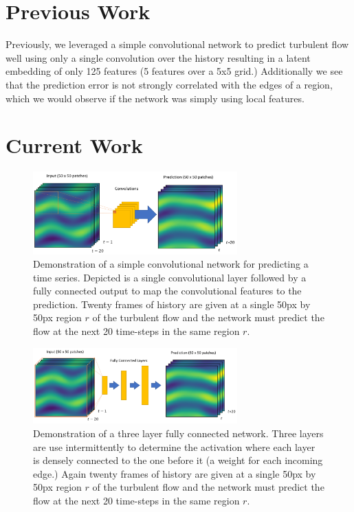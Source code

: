 \documentclass[10pt,letterpaper]{article}
\author{Brandon Houghton}
\begin{document}
	


\section{Previous Work}
Previously, we leveraged a simple convolutional network to predict turbulent flow  well using only a single convolution over the history resulting in a latent embedding of only 125 features (5 features over a 5x5 grid.) Additionally we see that the prediction error is not strongly correlated with the edges of a region, which we would observe if the network was simply using local features. 

\section{Current Work}


\begin{figure}
	\begin{center}
		\includegraphics[width=0.7\textwidth]{images/network_conv.PNG}
		\caption{\small Demonstration of a simple convolutional network for predicting a time series. Depicted is a single convolutional layer followed by a fully connected output to map the convolutional features to the prediction. Twenty frames of history are given at a single 50px by 50px region $r$ of the turbulent flow and the network must predict the flow at the next 20 time-steps in the same region $r$.}
		\label{net_con}
	\end{center}	
\end{figure}

\begin{figure}
	\begin{center}
		\includegraphics[width=0.7\textwidth]{images/network_fc.PNG}
		\caption{\small Demonstration of a three layer fully connected network. Three layers are use intermittently to determine the activation where each layer is densely connected to the one before it (a weight for each incoming edge.) Again twenty frames of history are given at a single 50px by 50px region $r$ of the turbulent flow and the network must predict the flow at the next 20 time-steps in the same region $r$.}
		\label{net_fc}
	\end{center}	
\end{figure}
\end{document}
